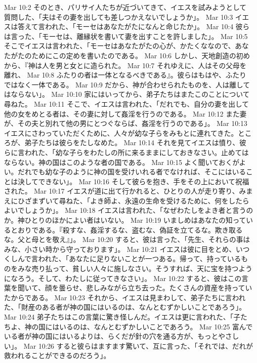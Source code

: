 Mar 10:2  そのとき、パリサイ人たちが近づいてきて、イエスを試みようとして質問した、「夫はその妻を出しても差しつかえないでしょうか」。
Mar 10:3  イエスは答えて言われた、「モーセはあなたがたになんと命じたか」。
Mar 10:4  彼らは言った、「モーセは、離縁状を書いて妻を出すことを許しました」。
Mar 10:5  そこでイエスは言われた、「モーセはあなたがたの心が、かたくななので、あなたがたのためにこの定めを書いたのである。
Mar 10:6  しかし、天地創造の初めから、『神は人を男と女とに造られた。
Mar 10:7  それゆえに、人はその父母を離れ、
Mar 10:8  ふたりの者は一体となるべきである』。彼らはもはや、ふたりではなく一体である。
Mar 10:9  だから、神が合わせられたものを、人は離してはならない」。
Mar 10:10  家にはいってから、弟子たちはまたこのことについて尋ねた。
Mar 10:11  そこで、イエスは言われた、「だれでも、自分の妻を出して他の女をめとる者は、その妻に対して姦淫を行うのである。
Mar 10:12  また妻が、その夫と別れて他の男にとつぐならば、姦淫を行うのである」。
Mar 10:13  イエスにさわっていただくために、人々が幼な子らをみもとに連れてきた。ところが、弟子たちは彼らをたしなめた。
Mar 10:14  それを見てイエスは憤り、彼らに言われた、「幼な子らをわたしの所に来るままにしておきなさい。止めてはならない。神の国はこのような者の国である。
Mar 10:15  よく聞いておくがよい。だれでも幼な子のように神の国を受けいれる者でなければ、そこにはいることは決してできない」。
Mar 10:16  そして彼らを抱き、手をその上において祝福された。
Mar 10:17  イエスが道に出て行かれると、ひとりの人が走り寄り、みまえにひざまずいて尋ねた、「よき師よ、永遠の生命を受けるために、何をしたらよいでしょうか」。
Mar 10:18  イエスは言われた、「なぜわたしをよき者と言うのか。神ひとりのほかによい者はいない。
Mar 10:19  いましめはあなたの知っているとおりである。『殺すな、姦淫するな、盗むな、偽証を立てるな。欺き取るな。父と母とを敬え』」。
Mar 10:20  すると、彼は言った、「先生、それらの事はみな、小さい時から守っております」。
Mar 10:21  イエスは彼に目をとめ、いつくしんで言われた、「あなたに足りないことが一つある。帰って、持っているものをみな売り払って、貧しい人々に施しなさい。そうすれば、天に宝を持つようになろう。そして、わたしに従ってきなさい」。
Mar 10:22  すると、彼はこの言葉を聞いて、顔を曇らせ、悲しみながら立ち去った。たくさんの資産を持っていたからである。
Mar 10:23  それから、イエスは見まわして、弟子たちに言われた、「財産のある者が神の国にはいるのは、なんとむずかしいことであろう」。
Mar 10:24  弟子たちはこの言葉に驚き怪しんだ。イエスは更に言われた、「子たちよ、神の国にはいるのは、なんとむずかしいことであろう。
Mar 10:25  富んでいる者が神の国にはいるよりは、らくだが針の穴を通る方が、もっとやさしい」。
Mar 10:26  すると彼らはますます驚いて、互に言った、「それでは、だれが救われることができるのだろう」。
